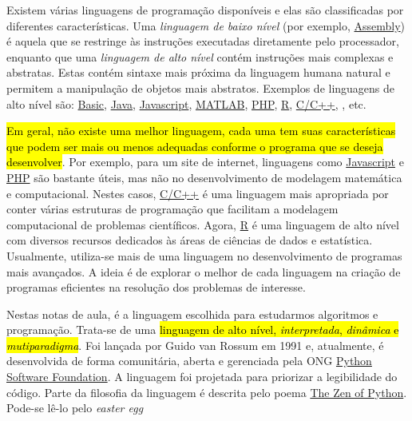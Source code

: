 Existem várias linguagens de programação disponíveis e elas são classificadas por diferentes características. Uma \emph{linguagem de baixo nível} (por exemplo, \href{https://pt.wikipedia.org/wiki/Linguagem_assembly}{Assembly}) é aquela que se restringe às instruções executadas diretamente pelo processador, enquanto que uma \emph{linguagem de alto nível} contém instruções mais complexas e abstratas. Estas contém sintaxe mais próxima da linguagem humana natural e permitem a manipulação de objetos mais abstratos. Exemplos de linguagens de alto nível são: \href{https://pt.wikipedia.org/wiki/BASIC}{Basic}, \href{https://pt.wikipedia.org/wiki/Java\_(linguagem\_de\_programa\%C3\%A7\%C3\%A3o)}{Java}, \href{https://pt.wikipedia.org/wiki/JavaScript}{Javascript}, \href{https://pt.wikipedia.org/wiki/MATLAB}{MATLAB}, \href{https://pt.wikipedia.org/wiki/PHP}{PHP}, \href{https://pt.wikipedia.org/wiki/R\_(linguagem_de_programa\%C3\%A7\%C3\%A3o)}{R}, \href{https://pt.wikipedia.org/wiki/C\%2B\%2B}{C/C++}, {\python}, etc.

\hl{Em geral, não existe uma melhor linguagem, cada uma tem suas características que podem ser mais ou menos adequadas conforme o programa que se deseja desenvolver}. Por exemplo, para um site de internet, linguagens como \href{https://pt.wikipedia.org/wiki/JavaScript}{Javascript} e \href{https://pt.wikipedia.org/wiki/PHP}{PHP} são bastante úteis, mas não no desenvolvimento de modelagem matemática e computacional. Nestes casos, \href{https://pt.wikipedia.org/wiki/C\%2B\%2B}{C/C++} é uma linguagem mais apropriada por conter várias estruturas de programação que facilitam a modelagem computacional de problemas científicos. Agora, \href{https://pt.wikipedia.org/wiki/R\_(linguagem_de_programa\%C3\%A7\%C3\%A3o)}{R} é uma linguagem de alto nível com diversos recursos dedicados às áreas de ciências de dados e estatística. Usualmente, utiliza-se mais de uma linguagem no desenvolvimento de programas mais avançados. A ideia é de explorar o melhor de cada linguagem na criação de programas eficientes na resolução dos problemas de interesse.

Nestas notas de aula, \hl{{\python}} é a linguagem escolhida para estudarmos algoritmos e programação. Trata-se de uma \hl{linguagem de alto nível, \emph{interpretada}, \emph{dinâmica} e \emph{mutiparadigma}}. Foi lançada por Guido van Rossum{\rossum} em 1991 e, atualmente, é desenvolvida de forma comunitária, aberta e gerenciada pela ONG \href{https://pt.wikipedia.org/wiki/Python_Software_Foundation}{Python Software Foundation}. A linguagem foi projetada para priorizar a legibilidade do código. Parte da filosofia da linguagem é descrita pelo poema \href{https://pt.wikipedia.org/wiki/Zen_de_Python}{The Zen of Python}. Pode-se lê-lo pelo \textit{easter egg} {\python}

